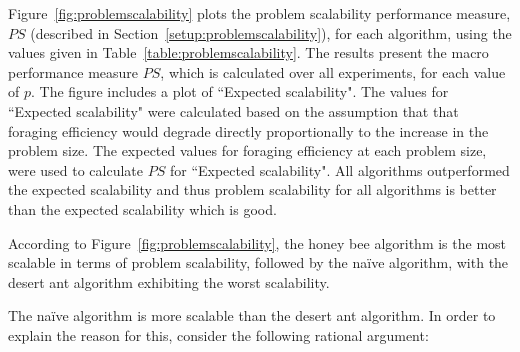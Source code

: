 Figure~\ref{fig:problemscalability} plots the problem scalability performance measure, $PS$ (described in Section~\ref{setup:problemscalability}), for each algorithm, using the values given in Table~\ref{table:problemscalability}. The results present the macro performance measure $PS$, which is calculated over all experiments, for each value of $p$. The figure includes a plot of ``Expected scalability". The values for ``Expected scalability" were calculated based on the assumption that  that foraging efficiency would degrade directly proportionally to the increase in the problem size. The expected values for foraging efficiency at each problem size, were used to calculate $PS$ for ``Expected scalability". All algorithms outperformed the expected scalability and thus problem scalability for all algorithms is better than the expected scalability which is good. 

According to Figure~\ref{fig:problemscalability}, the honey bee algorithm is the most scalable in terms of problem scalability, followed by the na\"ive algorithm, with the desert ant algorithm exhibiting the worst scalability. %


The na\"ive algorithm is more scalable than the desert ant algorithm. In order to explain the reason for this, consider the following rational argument:

